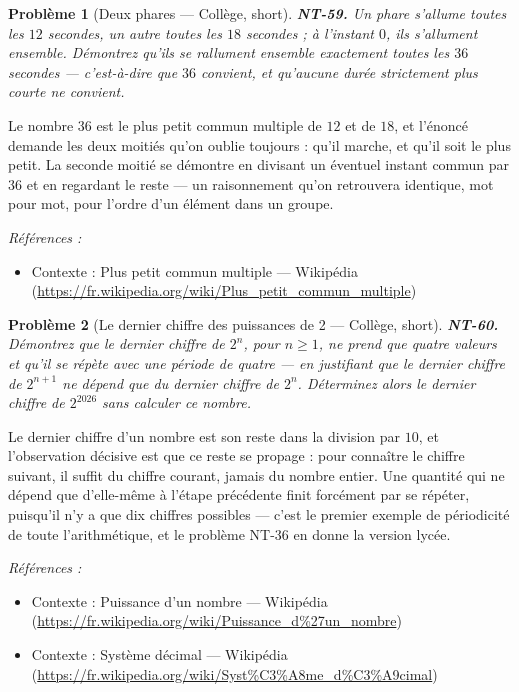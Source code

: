 \documentclass[11pt]{article}
\newtheorem{problem}{Problème}
\newenvironment{refs}{\par\small\noindent\emph{Références :}\begin{itemize}\setlength\itemsep{0pt}}{\end{itemize}\normalsize}
\begin{document}
\bigskip

\begin{problem}[{Deux phares --- Collège, short}]
\textbf{NT-59.} Un phare s'allume toutes les $ 12 $ secondes, un autre toutes
les $ 18 $ secondes ; à l'instant $ 0 $, ils s'allument ensemble. Démontrez qu'ils se rallument
ensemble exactement toutes les $ 36 $ secondes --- c'est-à-dire que $ 36 $ convient, et qu'aucune
durée strictement plus courte ne convient.
\end{problem}

\noindent Le nombre $ 36 $ est le plus petit commun multiple de $ 12 $ et de $ 18 $, et
l'énoncé demande les deux moitiés qu'on oublie toujours : qu'il marche, et qu'il soit le plus petit.
La seconde moitié se démontre en divisant un éventuel instant commun par $ 36 $ et en regardant le
reste --- un raisonnement qu'on retrouvera identique, mot pour mot, pour l'ordre d'un élément dans un
groupe.

\begin{refs}
\item Contexte : Plus petit commun multiple --- Wikipédia (\url{https://fr.wikipedia.org/wiki/Plus_petit_commun_multiple})
\end{refs}

\bigskip

\begin{problem}[{Le dernier chiffre des puissances de 2 --- Collège, short}]
\textbf{NT-60.} Démontrez que le dernier chiffre de $ 2^n $, pour
$ n \ge 1 $, ne prend que quatre valeurs et qu'il se répète avec une période de quatre --- en
justifiant que le dernier chiffre de $ 2^{n+1} $ ne dépend que du dernier chiffre de $ 2^n $. Déterminez
alors le dernier chiffre de $ 2^{2026} $ sans calculer ce nombre.
\end{problem}

\noindent Le dernier chiffre d'un nombre est son reste dans la division par $ 10 $, et
l'observation décisive est que ce reste se propage : pour connaître le chiffre suivant, il suffit du
chiffre courant, jamais du nombre entier. Une quantité qui ne dépend que d'elle-même à l'étape
précédente finit forcément par se répéter, puisqu'il n'y a que dix chiffres possibles --- c'est le
premier exemple de périodicité de toute l'arithmétique, et le problème NT-36 en donne la version
lycée.

\begin{refs}
\item Contexte : Puissance d'un nombre --- Wikipédia (\url{https://fr.wikipedia.org/wiki/Puissance_d%27un_nombre})
\item Contexte : Système décimal --- Wikipédia (\url{https://fr.wikipedia.org/wiki/Syst%C3%A8me_d%C3%A9cimal})
\end{refs}
\end{document}

